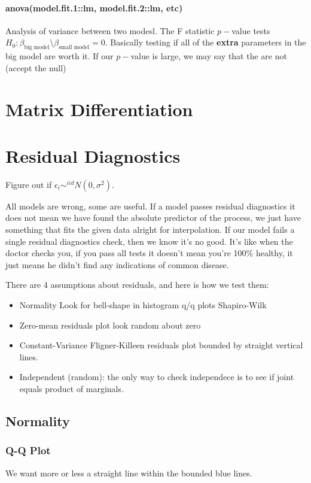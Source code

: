 \documentclass{article}
\begin{document}
\paragraph{anova(model.fit.1::lm, model.fit.2::lm, etc)}
Analysis of variance between two modesl. The F statistic $p-$value tests $H_0: \beta_{\text{big model}} \setminus \beta_{\text{small model}} = 0 $. Basically testing if all of the \textbf{extra} parameters in the big model are worth it. If our $p-$value is large, we may say that the are not (accept the null)


\section{Matrix Differentiation}


\section{Residual Diagnostics}
Figure out if $\epsilon_i \sim^{iid} N(0, \sigma ^2)$. 

All models are wrong, some are useful. If a model passes residual diagnostics it does not mean we have found the absolute predictor of the process, we just have something that fits the given data alright for interpolation. If our model fails a single residual diagnostics check, then we know it's no good. It's like when the doctor checks you, if you pass all tests it doesn't mean you're 100\% healthy, it just means he didn't find any indications of common disease. 

There are 4 assumptions about residuals, and here is how we test them:
\begin{itemize}
\item Normality
\subitem Look for bell-shape in histogram
\subitem q/q plots 
\subitem Shapiro-Wilk
\item Zero-mean
\subitem residuals plot look random about zero 
\item Constant-Variance 
\subitem Fligner-Killeen 
\subitem residuals plot bounded by straight vertical lines. 
\item Independent (random):
\subitem the only way to check independece is to see if joint equals product of marginals.
\end{itemize}

\subsection{Normality}
\subsubsection{Q-Q Plot}
We want more or less a straight line within the bounded blue lines.
\end{document}
